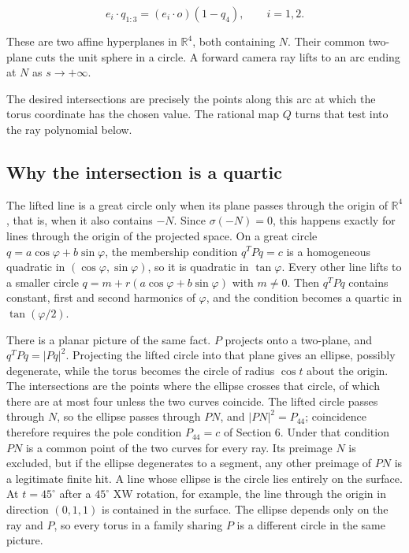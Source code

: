 \documentclass[11pt,a4paper]{article}
\begin{document}
\[
e_i\cdot q_{1:3}=(e_i\cdot o)(1-q_4),\qquad i=1,2.
\]

These are two affine hyperplanes in \(\mathbb R^4\), both containing
\(N\). Their common two-plane cuts the unit sphere in a circle. A
forward camera ray lifts to an arc ending at \(N\) as \(s\to+\infty\).

The desired intersections are precisely the points along this arc at
which the torus coordinate has the chosen value. The rational map \(Q\)
turns that test into the ray polynomial below.

\subsection{Why the intersection is a
quartic}\label{why-the-intersection-is-a-quartic}

The lifted line is a great circle only when its plane passes through the
origin of \(\mathbb R^4\), that is, when it also contains \(-N\). Since
\(\sigma(-N)=0\), this happens exactly for lines through the origin of
the projected space. On a great circle \(q=a\cos\varphi+b\sin\varphi\),
the membership condition \(q^TPq=c\) is a homogeneous quadratic in
\((\cos\varphi,\sin\varphi)\), so it is quadratic in \(\tan\varphi\).
Every other line lifts to a smaller circle
\(q=m+r(a\cos\varphi+b\sin\varphi)\) with \(m\neq0\). Then \(q^TPq\)
contains constant, first and second harmonics of \(\varphi\), and the
condition becomes a quartic in \(\tan(\varphi/2)\).

There is a planar picture of the same fact. \(P\) projects onto a
two-plane, and \(q^TPq=|Pq|^2\). Projecting the lifted circle into that
plane gives an ellipse, possibly degenerate, while the torus becomes the
circle of radius \(\cos t\) about the origin. The intersections are the
points where the ellipse crosses that circle, of which there are at most
four unless the two curves coincide. The lifted circle passes through
\(N\), so the ellipse passes through \(PN\), and \(|PN|^2=P_{44}\);
coincidence therefore requires the pole condition \(P_{44}=c\) of
Section 6. Under that condition \(PN\) is a common point of the two
curves for every ray. Its preimage \(N\) is excluded, but if the ellipse
degenerates to a segment, any other preimage of \(PN\) is a legitimate
finite hit. A line whose ellipse is the circle lies entirely on the
surface. At \(t=45^\circ\) after a \(45^\circ\) XW rotation, for
example, the line through the origin in direction \((0,1,1)\) is
contained in the surface. The ellipse depends only on the ray and \(P\),
so every torus in a family sharing \(P\) is a different circle in the
same picture.
\end{document}
